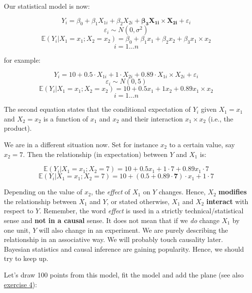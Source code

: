 \documentclass[
]{book}
\begin{document}
Our statistical model is now:

\[ Y_i = \beta_0 + \beta_1 X_{1i} + \beta_2 X_{2i} + \mathbf{\beta_3 X_{1i} \times X_{2i}} + \varepsilon_i\]
\[ \varepsilon_i \sim N(0, \sigma^2)\]
\[ \mathbb{E}(Y_i|X_1 = x_1; X_2 = x_2) = \beta_0 + \beta_1 x_{1} + \beta_2 x_{2} + \beta_3 x_{1} \times x_{2}\]
\[ i = 1 \ldots n\]

for example:

\[ Y_i = 10 + 0.5 \cdot X_{1i} + 1 \cdot X_{2i} + 0.89 \cdot X_{1i} \times X_{2i} + \varepsilon_i\]
\[ \varepsilon_i \sim N(0, 5)\]
\[ \mathbb{E}(Y_i|X_1 = x_1; X_2 = x_2) = 10 + 0.5 x_1 + 1 x_2 + 0.89 x_1 \times x_2\]
\[ i = 1 \ldots n\]

The second equation states that the conditional expectation of \(Y_i\) given \(X_1=x_1\) and \(X_2=x_2\)
is a function of \(x_1\) and \(x_2\) and their interaction \(x_1 \times x_2\) (i.e., the product).

We are in a different situation now.
Set for instance \(x_2\) to a certain value, say \(x_2 = 7\). Then the relationship (in expectation)
between \(Y\) and \(X_1\) is:

\[ \mathbb{E}(Y_i|X_1 = x_1; X_2 = 7) = 10 + 0.5 x_1 + 1 \cdot 7 + 0.89 x_1 \cdot 7\]
\[ \mathbb{E}(Y_i|X_1 = x_1; X_2 = 7) = 10 + (0.5 + 0.89 \cdot \mathbf{7}) \cdot x_1 + 1 \cdot 7\]

Depending on the value of \(x_2\), the \emph{effect} of \(X_1\) on \(Y\) changes.
Hence, \(X_2\) \textbf{modifies} the relationship between \(X_1\) and \(Y\), or stated otherwise,
\(X_1\) and \(X_2\) \textbf{interact} with respect to \(Y\). Remember, the word \emph{effect} is
used in a strictly technical/statistical sense and \textbf{not in a causal} sense.
It does not mean that if we \emph{do} change \(X_1\) by one unit,
\(Y\) will also change in an experiment. We are purely describing the relationship
in an associative way. We will probably touch causality later.
Bayesian statistics and causal inference are gaining popularity. Hence, we should try to keep up.

Let's draw 100 points from this model, fit the model and add the plane (see also \hyperref[exercise3_multiple_regression]{exercise 4}):
\end{document}
